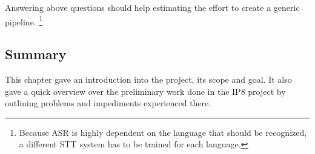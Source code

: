 Answering above questions should help estimating the effort to create a generic pipeline. \footnote{Because \ac{ASR} is highly dependent on the language that should be recognized, a different \ac{STT} system has to be trained for each language.}

\subsection{Summary}
This chapter gave an introduction into the project, its scope and goal. It also gave a quick overview over the preliminary work done in the IP8 project by outlining problems and impediments experienced there.